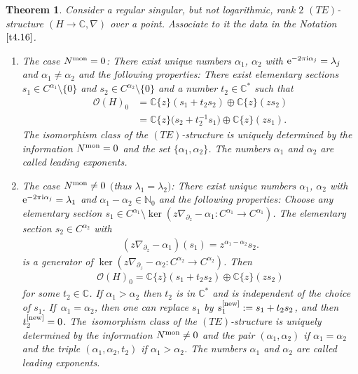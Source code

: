 \documentclass[10pt,a4paper]{amsart}
\numberwithin{equation}{section}
\numberwithin{figure}{section}
\newcommand{\N}{{\mathbb N}}
\newcommand{\C}{{\mathbb C}}
\newcommand{\OO}{{\mathcal O}}
\newcommand{\paa}{\partial}
\newcommand{\nnn}{\nabla}
\newtheorem{Theorem}{Theorem}[section]
\begin{document}
\begin{Theorem}\label{t4.17}
Consider a regular singular, but not logarithmic,
rank $2$ $(TE)$-structure $(H\to\C,\nnn)$ over a point.
Associate to it the data in the Notation~$\ref{t4.16}$.
\begin{enumerate}\itemsep=0pt
\item[$(a)$] The case $N^{\rm mon}=0$:
There exist unique numbers $\alpha_1$, $\alpha_2$
with ${\rm e}^{-2\pi {\rm i}\alpha_j}=\lambda_j$
and $\alpha_1\neq\alpha_2$ and the following properties:
There exist elementary sections $s_1\in C^{\alpha_1}\setminus\{0\}$
and $s_2\in C^{\alpha_2}\setminus\{0\}$ and a number $t_2\in\C^*$
such that
\begin{align}
\label{4.48}
\OO(H)_0&=\C\{z\}(s_1+t_2s_2)\oplus \C\{z\}(zs_2)
\\
&= \C\{z\}\big(s_2+t_2^{-1}s_1\big)\oplus \C\{z\}(zs_1).
\label{4.49}
\end{align}
The isomorphism class of the $(TE)$-structure is
uniquely determined by the information $N^{\rm mon}=0$
and the set $\{\alpha_1,\alpha_2\}$.
The numbers $\alpha_1$ and $\alpha_2$ are called
leading exponents.

\item[$(b)$] The case $N^{\rm mon}\neq 0$ $($thus $\lambda_1=\lambda_2)$:
There exist unique numbers $\alpha_1$, $\alpha_2$
with ${\rm e}^{-2\pi {\rm i}\alpha_j}=\lambda_1$ and
$\alpha_1-\alpha_2\in\N_0$
and the following properties:
Choose any elementary section
$s_1\in C^{\alpha_1}\setminus \ker(z\nnn_{\paa_z}-\alpha_1\colon
C^{\alpha_1}\to C^{\alpha_1})$.
The elementary section $s_2\in C^{\alpha_2}$ with
\begin{gather}\label{4.50}
(z\nnn_{\paa_z}-\alpha_1)(s_1)=z^{\alpha_1-\alpha_2}s_2.
\end{gather}
is a generator of
$\ker(z\nnn_{\paa_z}-\alpha_2\colon C^{\alpha_2}\to C^{\alpha_2})$.
Then
\begin{gather}\label{4.51}
\OO(H)_0=\C\{z\}(s_1+t_2s_2)\oplus \C\{z\}(zs_2)
\end{gather}
for some $t_2\in\C$. If $\alpha_1>\alpha_2$ then
$t_2$ is in $\C^*$ and is independent of the choice of
$s_1$. If~\mbox{$\alpha_1=\alpha_2$}, then one can replace
$s_1$ by $s_1^{\rm[new]}:=s_1+t_2s_2$, and then
$t_2^{\rm[new]}=0$.
The~iso\-morphism class of the $(TE)$-structure is
uniquely determined by the information $N^{\rm mon}\neq 0$
and the pair $(\alpha_1,\alpha_2)$ if $\alpha_1=\alpha_2$
and the triple $(\alpha_1,\alpha_2,t_2)$ if $\alpha_1>\alpha_2$.
The numbers $\alpha_1$ and $\alpha_2$ are called
leading exponents.
\end{enumerate}
\end{Theorem}
\end{document}
